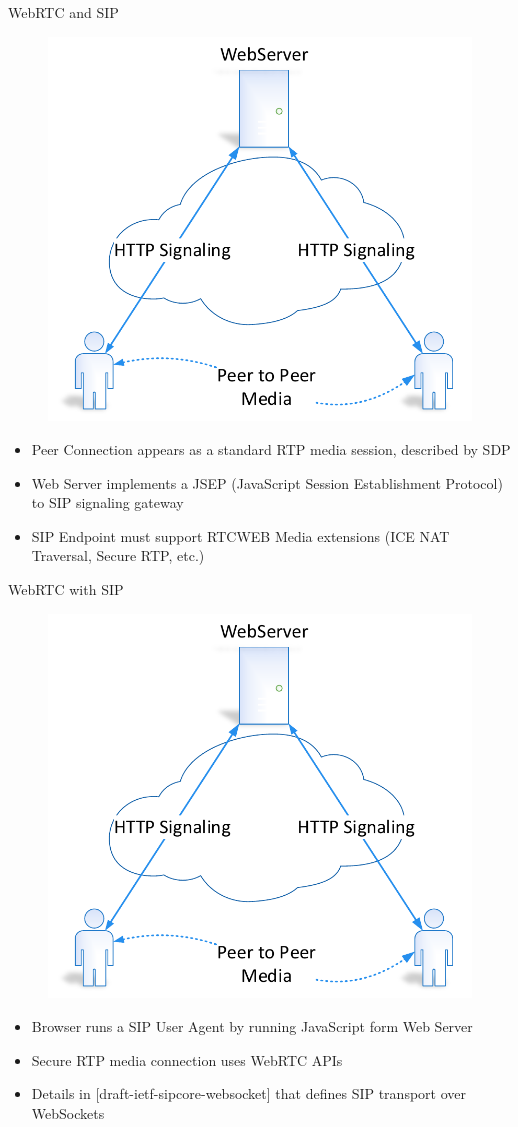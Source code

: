 \begin{frame}{WebRTC and SIP}
\begin{figure}
\includegraphics[page=5,width=.6\textwidth]{image/webrtc.pdf}
\end{figure}
\begin{itemize}
\item Peer Connection appears as a standard RTP media session, described by SDP
\item Web Server implements a JSEP (JavaScript Session Establishment Protocol) to SIP signaling gateway
\item SIP Endpoint must support RTCWEB Media extensions (ICE NAT Traversal, Secure RTP, etc.)
\end{itemize}
\end{frame}

\begin{frame}{WebRTC with SIP}
\begin{figure}
\includegraphics[page=6,width=.6\textwidth]{image/webrtc.pdf}
\end{figure}
\begin{itemize}
\item Browser runs a SIP User Agent by running JavaScript form Web Server
\item Secure RTP media connection uses WebRTC APIs
\item Details in [draft-ietf-sipcore-websocket] that defines SIP transport over WebSockets
\end{itemize}
\end{frame}

